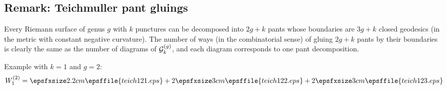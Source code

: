 \subsection{Remark: Teichmuller pant gluings}

Every Riemann surface of genus $g$ with $k$ punctures can be decomposed into 
$2g+k$ pants whose boundaries are $3g+k$ closed geodesics (in the metric with constant negative curvature).
The number of ways (in the combinatorial sense) of gluing $2g+k$ pants by their boundaries is clearly the same as the number of diagrams of ${\cal G}_{k}^{(g)}$, and each diagram corresponds to one pant decomposition.


Example with $k=1$ and $g=2$:
$$
W_1^{(2)}={\epsfxsize 2.2cm\epsffile{teich121.eps}}+2 {\epsfxsize 3cm\epsffile{teich122.eps}}+2 {\epsfxsize 3cm\epsffile{teich123.eps}}
$$




